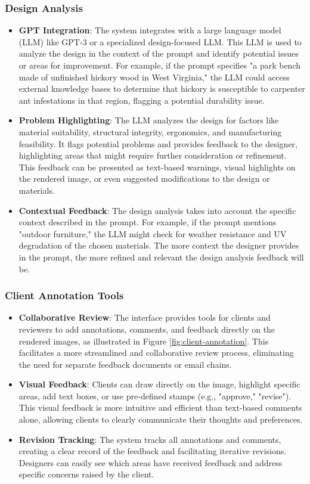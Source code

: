 \documentclass{article}
\begin{document}
\subsubsection{Design Analysis}
\begin{itemize}
\item \textbf{GPT Integration}: The system integrates with a large language model (LLM) like GPT-3 or a specialized design-focused LLM. This LLM is used to analyze the design in the context of the prompt and identify potential issues or areas for improvement. For example, if the prompt specifies "a park bench made of unfinished hickory wood in West Virginia," the LLM could access external knowledge bases to determine that hickory is susceptible to carpenter ant infestations in that region, flagging a potential durability issue.
\item \textbf{Problem Highlighting}: The LLM analyzes the design for factors like material suitability, structural integrity, ergonomics, and manufacturing feasibility. It flags potential problems and provides feedback to the designer, highlighting areas that might require further consideration or refinement. This feedback can be presented as text-based warnings, visual highlights on the rendered image, or even suggested modifications to the design or materials.
\item \textbf{Contextual Feedback}: The design analysis takes into account the specific context described in the prompt. For example, if the prompt mentions "outdoor furniture," the LLM might check for weather resistance and UV degradation of the chosen materials. The more context the designer provides in the prompt, the more refined and relevant the design analysis feedback will be.
\end{itemize}

\subsubsection{Client Annotation Tools}
\begin{itemize}
\item \textbf{Collaborative Review}: The interface provides tools for clients and reviewers to add annotations, comments, and feedback directly on the rendered images, as illustrated in Figure \ref{fig:client-annotation}. This facilitates a more streamlined and collaborative review process, eliminating the need for separate feedback documents or email chains.
\item \textbf{Visual Feedback}: Clients can draw directly on the image, highlight specific areas, add text boxes, or use pre-defined stamps (e.g., "approve," "revise"). This visual feedback is more intuitive and efficient than text-based comments alone, allowing clients to clearly communicate their thoughts and preferences.
\item \textbf{Revision Tracking}: The system tracks all annotations and comments, creating a clear record of the feedback and facilitating iterative revisions. Designers can easily see which areas have received feedback and address specific concerns raised by the client.
\end{itemize}
\end{document}
